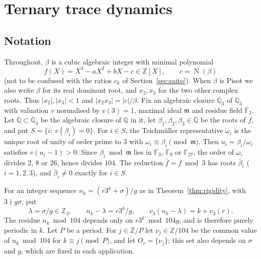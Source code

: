\documentclass[11pt,a4paper]{article}
\theoremstyle{definition}
\theoremstyle{remark}
\newcommand{\Q}{\mathbb{Q}}
\newcommand{\Z}{\mathbb{Z}}
\newcommand{\F}{\mathbb{F}}
\newcommand{\Qbar}{\overline{\mathbb{Q}}}
\newcommand{\Qt}{\mathbb{Q}_3}
\newcommand{\Qtbar}{\overline{\mathbb{Q}}_3}
\DeclareMathOperator{\Nm}{N}
\begin{document}
\section{Ternary trace dynamics}\label{sec:dynamics}

\subsection{Notation}
Throughout, $\beta$ is a cubic algebraic integer with minimal polynomial
\[
 f(X)=X^3-aX^2+bX-c\in\Z[X],\qquad c=\Nm(\beta)
\]
(not to be confused with the ratios $c_k$ of Section~\ref{sec:saito}).
When $\beta$ is Pisot we also write $\beta$ for its real dominant root, and $x_2,x_3$ for the two other complex roots. Thus $|x_2|,|x_3|<1$ and $|x_2x_3|=|c|/\beta$.
Fix an algebraic closure $\Qtbar$ of $\Qt$ with valuation $v$ normalised by $v(3)=1$, maximal ideal $\mathfrak m$ and residue field $\overline{\F}_3$.
Let $\Qbar\subset\Qtbar$ be the algebraic closure of $\Q$ in it, let $\beta_1,\beta_2,\beta_3\in\Qbar$ be the roots of $f$, and put $S=\{i:\ v(\beta_i)=0\}$.
For $i\in S$, the Teichm\"uller representative $\omega_i$ is the unique root of unity of order prime to $3$ with $\omega_i\equiv\beta_i\pmod{\mathfrak m}$. Then $u_i=\beta_i/\omega_i$ satisfies $v(u_i-1)>0$.
Since $\beta_i\bmod\mathfrak m$ lies in $\F_3$, $\F_9$ or $\F_{27}$, the order of $\omega_i$ divides $2$, $8$ or $26$, hence divides $104$.
The reduction $\bar f=f\bmod3$ has roots $\bar\beta_i$ ($i=1,2,3$), and $\bar\beta_i\ne0$ exactly for $i\in S$.

For an integer sequence $n_k=(r3^k+\sigma)/g$ as in Theorem~\ref{thm:rigidity}, with $3\nmid g\sigma$, put
\[
 \lambda=\sigma/g\in\Z_3,\qquad n_k-\lambda=r3^k/g,\qquad v_3(n_k-\lambda)=k+v_3(r).
\]
The residue $n_k\bmod104$ depends only on $r3^k\bmod104g$, and is therefore purely periodic in $k$.
Let $P$ be a period. For $j\in\Z/P$ let $\nu_j\in\Z/104$ be the common value of $n_k\bmod104$ for $k\equiv j\pmod P$, and let $O_r=\{\nu_j\}$; this set also depends on $\sigma$ and $g$, which are fixed in each application.
\end{document}

